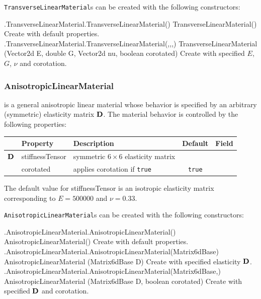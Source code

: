 {\tt TransverseLinearMaterial}s can be created with the following
constructors:
%
\begin{methodtable}{0.6}{0.4}
%
\methodentry
{\mats.TransverseLinearMaterial.TransverseLinearMaterial()}%
{TransverseLinearMaterial()}%
{Create with default properties.}%
%
\methodentry
{\mats.TransverseLinearMaterial.TransverseLinearMaterial(,,,)}%
{TransverseLinearMaterial (Vector2d E, double G, \brh
Vector2d nu, boolean corotated)}%
{Create with specified $E$, $G$, $\nu$ and corotation.}%
%
\end{methodtable}
%

\subsubsection{AnisotropicLinearMaterial}

is a general anisotropic linear material whose behavior is specified
by an arbitrary (symmetric) elasticity matrix ${\bf D}$.
%
The material behavior is controlled by the following properties:
%
\begin{center}
\begin{tabular}{|l|l|l|c|c|} 
\hline
 & Property & Description & Default & Field \\
\hline
${\bf D}$ & {\sf stiffnessTensor} & 
symmetric $6 \times 6$ elasticity matrix &  & \\
 & {\sf corotated} & applies corotation if {\tt true} & {\tt true} & \\ 
\hline
\end{tabular}
\end{center}
%
The default value for {\sf stiffnessTensor} is an isotropic elasticity
matrix corresponding to $E = 500000$ and $\nu = 0.33$.

{\tt AnisotropicLinearMaterial}s can be created with the following
constructors:
%
\begin{methodtable}{0.6}{0.4}
%
\methodentry
{\mats.AnisotropicLinearMaterial.AnisotropicLinearMaterial()}%
{AnisotropicLinearMaterial()}%
{Create with default properties.}%
%
\methodentry
{\mats.AnisotropicLinearMaterial.AnisotropicLinearMaterial(Matrix6dBase)}%
{AnisotropicLinearMaterial (Matrix6dBase D)}%
{Create with specified elasticity ${\bf D}$.}%
%
%
\methodentry
{\mats.AnisotropicLinearMaterial.AnisotropicLinearMaterial(Matrix6dBase,)}%
{AnisotropicLinearMaterial (Matrix6dBase D, boolean corotated)}%
{Create with specified ${\bf D}$ and corotation.}%
\end{methodtable}
%

